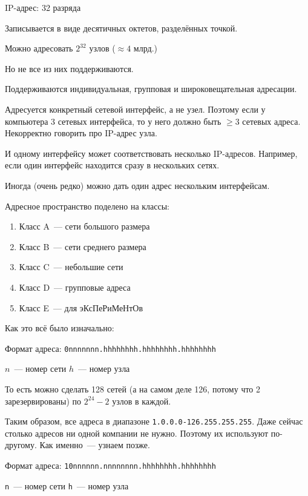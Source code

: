 
IP-адрес: 32 разряда

Записывается в виде десятичных октетов, разделённых точкой.

Можно адресовать $2^{32}$ узлов ($\approx 4\text{ млрд.}$)

Но не все из них поддерживаются.

Поддерживаются индивидуальная, групповая и широковещательная адресации.

Адресуется конкретный сетевой интерфейс, а не узел. Поэтому если у компьютера 3 сетевых интерфейса, то у него должно быть $\ge 3$ сетевых адреса. Некорректно говорить про IP-адрес узла.

И одному интерфейсу может соответствовать несколько IP-адресов. Например, если один интерфейс находится сразу в нескольких сетях.

Иногда (очень редко) можно дать один адрес нескольким интерфейсам.

Адресное пространство поделено на классы:

\begin{enumerate}
    \item Класс A~--- сети большого размера
    \item Класс B~--- сети среднего размера
    \item Класс C~--- небольшие сети
    \item Класс D~--- групповые адреса
    \item Класс E~--- для эКсПеРиМеНтОв
\end{enumerate}

Как это всё было изначально:


Формат адреса: {\tt 0nnnnnnn.hhhhhhhh.hhhhhhhh.hhhhhhhh}

$n$~--- номер сети
$h$~--- номер узла

То есть можно сделать 128 сетей (а на самом деле 126, потому что 2 зарезервированы) по $2^{24}-2$ узлов в каждой.

Таким образом, все адреса в диапазоне {\tt 1.0.0.0-126.255.255.255}. Даже сейчас столько адресов ни одной компании не нужно. Поэтому их используют по-другому. Как именно~--- узнаем позже.


Формат адреса: {\tt 10nnnnnn.nnnnnnnn.hhhhhhhh.hhhhhhhh}

{\tt n}~--- номер сети
{\tt h}~--- номер узла

